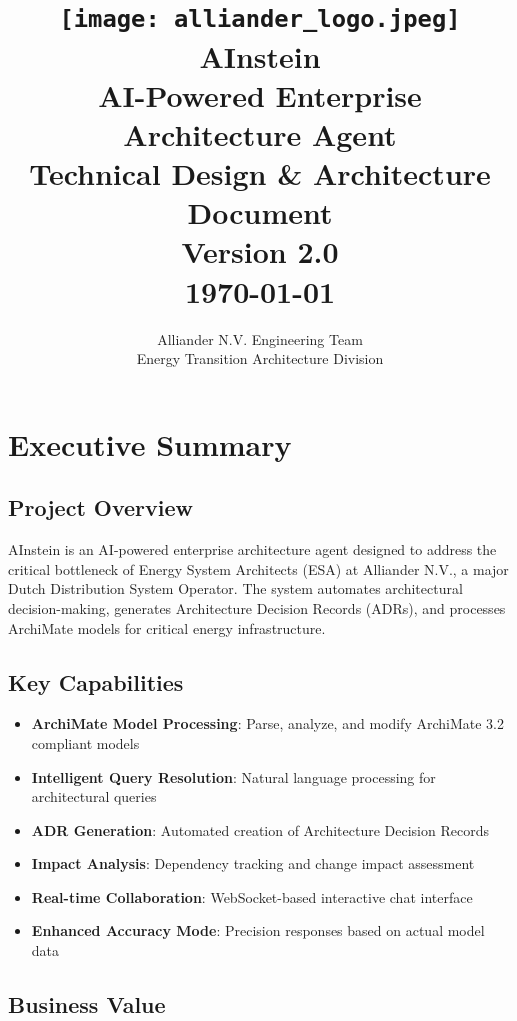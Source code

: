 \documentclass[12pt,a4paper]{report}
\title{
    \vspace{-2cm}
    \texttt{[image: alliander\_logo.jpeg]}\\[1cm]
    \Huge \textbf{AInstein}\\
    \Large AI-Powered Enterprise Architecture Agent\\[0.5cm]
    \huge Technical Design \& Architecture Document\\[1cm]
    \Large Version 2.0\\[0.5cm]
    \large \today
}
\author{
    \Large Alliander N.V. Engineering Team\\[0.3cm]
    \large Energy Transition Architecture Division
}
\date{}
\begin{document}
\maketitle
\newpage

\tableofcontents
\newpage

\chapter{Executive Summary}

\section{Project Overview}

AInstein is an AI-powered enterprise architecture agent designed to address the critical bottleneck of Energy System Architects (ESA) at Alliander N.V., a major Dutch Distribution System Operator. The system automates architectural decision-making, generates Architecture Decision Records (ADRs), and processes ArchiMate models for critical energy infrastructure.

\section{Key Capabilities}

\begin{itemize}
    \item \textbf{ArchiMate Model Processing}: Parse, analyze, and modify ArchiMate 3.2 compliant models
    \item \textbf{Intelligent Query Resolution}: Natural language processing for architectural queries
    \item \textbf{ADR Generation}: Automated creation of Architecture Decision Records
    \item \textbf{Impact Analysis}: Dependency tracking and change impact assessment
    \item \textbf{Real-time Collaboration}: WebSocket-based interactive chat interface
    \item \textbf{Enhanced Accuracy Mode}: Precision responses based on actual model data
\end{itemize}

\section{Business Value}
\end{document}
